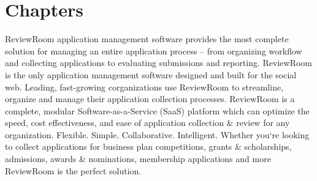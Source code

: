 \documentclass[letterpaper,10pt,english]{sphinxmanual}
\begin{document}
\chapter{Chapters}
\label{index:version-4-0}\label{index:chapters}\label{index:fluidsurveys-help-page}
ReviewRoom application management software provides the most complete solution for managing an entire application process – from organizing workflow and collecting applications to evaluating submissions and reporting. ReviewRoom is the only application management software designed and built for the social web. Leading, fast-growing corganizations use ReviewRoom to streamline, organize and manage their application collection processes. ReviewRoom is a complete, modular Software-as-a-Service (SaaS) platform which can optimize the speed, cost effectiveness, and ease of application collection \& review for any organization. Flexible. Simple. Collaborative. Intelligent. Whether you{}`re looking to collect applications for business plan competitions, grants \& scholarships, admissions, awards \& nominations, membership applications and more ReviewRoom is the perfect solution.
\end{document}
